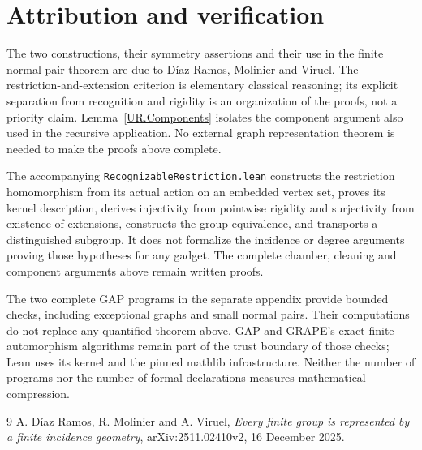 \section{Attribution and verification}
The two constructions, their symmetry assertions and their use in the finite
normal-pair theorem are due to D\'iaz Ramos, Molinier and Viruel. The
restriction-and-extension criterion is elementary classical reasoning; its
explicit separation from recognition and rigidity is an organization of the
proofs, not a priority claim. Lemma~\ref{UR.Components} isolates the component
argument also used in the recursive application. No external graph
representation theorem is needed to make the proofs above complete.

The accompanying \texttt{RecognizableRestriction.lean} constructs the
restriction homomorphism from its actual action on an embedded vertex set,
proves its kernel description, derives injectivity from pointwise rigidity and
surjectivity from existence of extensions, constructs the group equivalence,
and transports a distinguished subgroup. It does not formalize the incidence
or degree arguments proving those hypotheses for any gadget. The complete
chamber, cleaning and component arguments above remain written proofs.

The two complete GAP programs in the separate appendix provide bounded
checks, including exceptional graphs and small normal pairs. Their computations
do not replace any quantified theorem above. GAP and GRAPE's exact finite
automorphism algorithms remain part of the trust boundary of those checks;
Lean uses its kernel and the pinned mathlib infrastructure. Neither the number
of programs nor the number of formal declarations measures mathematical
compression.

\begin{thebibliography}{9}
 A. D\'iaz Ramos, R. Molinier and A. Viruel,
\emph{Every finite group is represented by a finite incidence geometry},
arXiv:2511.02410v2, 16 December 2025.
\end{thebibliography}
